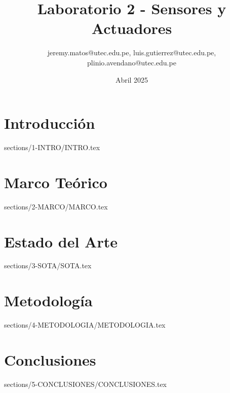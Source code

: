 \documentclass{report}
\title{Laboratorio 2 - Sensores y Actuadores}
\author{jeremy.matos@utec.edu.pe, luis.gutierrez@utec.edu.pe, plinio.avendano@utec.edu.pe}
\date{Abril 2025}
\begin{document}
\maketitle

\newpage
\tableofcontents



\chapter{Introducción}
{sections/1-INTRO/INTRO.tex}

\chapter{Marco Teórico}
{sections/2-MARCO/MARCO.tex}

\chapter{Estado del Arte}
{sections/3-SOTA/SOTA.tex}

\chapter{Metodología}
{sections/4-METODOLOGIA/METODOLOGIA.tex}

\chapter{Conclusiones}
{sections/5-CONCLUSIONES/CONCLUSIONES.tex}








\end{document}
